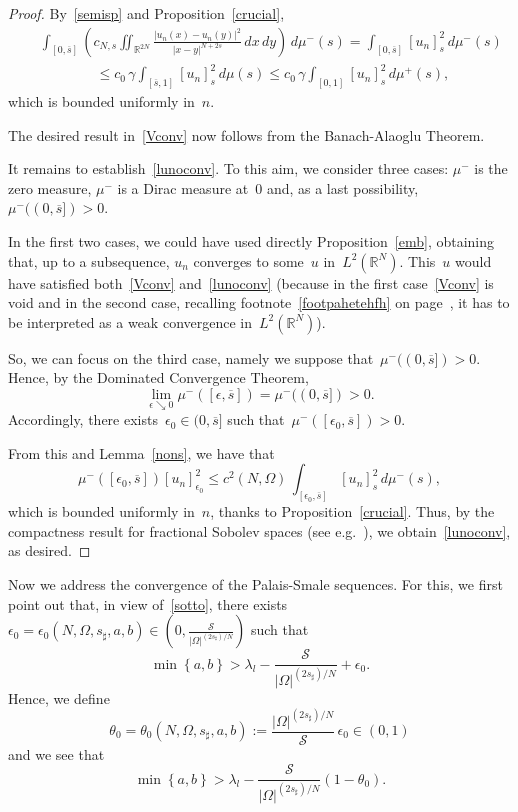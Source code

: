 \documentclass[12pt,a4paper,intlimits,sumlimits]{amsart}
\def \R {\mathbb{R}}
\newcommand{\set}[1]{\left\{#1\right\}}
\theoremstyle{definition}
\theoremstyle{plain}
\numberwithin{equation}{section}
\renewcommand{\le}{\leqslant}
\begin{document}
\begin{proof} By~\eqref{semisp} and Proposition~\ref{crucial},
\begin{eqnarray*}&&
\int_{[{{ 0 }}, \overline s]}\left(
{c_{N,s}} \iint_{\R^{2N}} \frac{|u_n(x) - u_n(y)|^2}{|x - y|^{N+2s}}\, dx\, dy\right)\,d\mu^-(s)
=\int_{[{{ 0 }}, \overline s]} [u_n]_{s}^2 \, d\mu^- (s)\\&&\qquad\qquad \le c_0\,\gamma \int_{[\overline s, 1]} [u_n]^2_{s} \, d\mu(s)\le c_0\,\gamma \int_{[{{ 0 }}, 1]} [u_n]^2_{s}\, d\mu^+ (s),
\end{eqnarray*}
which is bounded uniformly in~$n$.

The desired result in~\eqref{Vconv}
now follows from the Banach-Alaoglu Theorem.

It remains to establish~\eqref{lunoconv}. To this aim, we consider three cases:
$\mu^-$ is the zero measure, $\mu^-$ is a Dirac measure at~$0$
and, as a last possibility, $\mu^-((0,\overline{s}])>0$.

In the first two cases, we could have used directly Proposition~\ref{emb}, obtaining that, up to a subsequence, $u_n$ converges to some~$u$
in~$L^2(\R^N)$. This~$u$ would have satisfied 
both~\eqref{Vconv} and~\eqref{lunoconv} (because in the first case~\eqref{Vconv} is void and in the second case,
recalling footnote~\ref{footpahetehfh} on page~\pageref{footpahetehfh}, it has to be interpreted as
a weak convergence in~$L^2(\R^N)$). 

So, we can focus on the third case, namely we suppose that~$\mu^-((0,\overline{s}])>0$. Hence, by the Dominated Convergence Theorem, 
$$ \lim_{\epsilon\searrow0} \mu^-([\epsilon,\overline{s}])
=\mu^-((0,\overline{s}])>0.$$
Accordingly, there exists~$\epsilon_0\in(0,\overline{s}]$ such that~$\mu^-([\epsilon_0,\overline{s}])>0$.

{F}rom this and Lemma~\ref{nons},
we have that
$$\mu^-([\epsilon_0,\overline{s}])[u_n]^2_{\epsilon_0}\le c^2(N,\Omega) \, \int_{[\epsilon_0,\overline{s}]}[u_n]_{s}^2\,d\mu^-(s),
$$
which is bounded uniformly in~$n$, thanks to Proposition~\ref{crucial}.
Thus, by the compactness result for fractional Sobolev spaces (see e.g.~\cite{MR2944369}), we obtain~\eqref{lunoconv}, as desired. 
\end{proof}

Now we address the convergence of the Palais-Smale sequences. For this, we first point out that, in view of~\eqref{sotto},
there exists~$\epsilon_0=\epsilon_0(N,\Omega, s_\sharp, a,b)\in\left(0,\frac{{\mathcal{S}}}{|\Omega|^{(2 s_\sharp)/N}}\right)$ such that
\begin{equation*}
\min \set{a,b} > \lambda_l - \frac{\mathcal S}{|\Omega|^{(2 s_\sharp)/N}}+\epsilon_0.
\end{equation*}
Hence, we define
$$ \theta_0=\theta_0(N,\Omega, s_\sharp, a,b):=\frac{|\Omega|^{(2 s_\sharp)/N}}{\mathcal S}\,\epsilon_0\in(0,1)$$
and we see that
\begin{equation}\label{sottoBIS}
\min \set{a,b} > \lambda_l - \frac{\mathcal S}{|\Omega|^{(2 s_\sharp)/N}}(1-\theta_0).
\end{equation}
\end{document}
